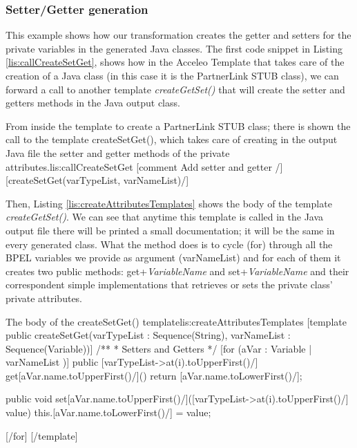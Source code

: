 \subsubsection{Setter/Getter generation}
\label{sec:setterGetter}
This example shows how our transformation creates the getter and setters for the private variables in the generated Java classes.
The first code snippet in Listing \ref{lis:callCreateSetGet}, shows how in the Acceleo Template that takes care of the creation of a Java class (in this case it is the PartnerLink STUB class), we can forward a call to another template \textit{createGetSet()} that will create the setter and getters methods in the Java output class. 
\begin{center}
  \begin{minipage}{1\textwidth}
    \begin{java-code}{From inside the template to create a PartnerLink STUB class; there is shown the call to the template createSetGet(), which takes care of creating in the output Java file the setter and getter methods of the private attributes.}{lis:callCreateSetGet}
[comment Add setter and getter /]
[createSetGet(varTypeList, varNameList)/]	
    \end{java-code}
  \end{minipage}
\end{center}

Then, Listing \ref{lis:createAttributesTemplates} shows the body of the template \textit{createGetSet()}. We can see that anytime this template is called in the Java output file there will be printed a small documentation; it will be the same in every generated class. What the method does is to cycle (for) through all the BPEL variables we provide as argument (varNameList) and for each of them it creates two public methods: get+\textit{VariableName} and set+\textit{VariableName} and their correspondent simple implementations that retrieves or sets the private class' private attributes.

\begin{center}
\begin{minipage}{1\textwidth}
  \begin{java-code}{The body of the createSetGet() template}{lis:createAttributesTemplates}
[template public createSetGet(varTypeList : Sequence(String), varNameList : Sequence(Variable))]
    /**
     * Setters and Getters    
     */
[for (aVar : Variable | varNameList )]
public [varTypeList->at(i).toUpperFirst()/] get[aVar.name.toUpperFirst()/]() {
	return [aVar.name.toLowerFirst()/];
}

public void set[aVar.name.toUpperFirst()/]([varTypeList->at(i).toUpperFirst()/] value) {  
	this.[aVar.name.toLowerFirst()/] = value;
}

[/for]
[/template]	
    \end{java-code}
  \end{minipage}
\end{center}

